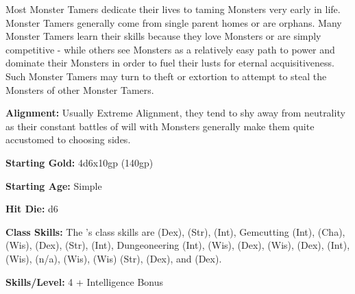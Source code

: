 
Most Monster Tamers dedicate their lives to taming Monsters very early in life. Monster Tamers generally come from single parent homes or are orphans. Many Monster Tamers learn their skills because they love Monsters or are simply competitive - while others see Monsters as a relatively easy path to power and dominate their Monsters in order to fuel their lusts for eternal acquisitiveness. Such Monster Tamers may turn to theft or extortion to attempt to steal the Monsters of other Monster Tamers.

\textbf{Alignment:} Usually Extreme Alignment, they tend to shy away from neutrality as their constant battles of will with Monsters generally make them quite accustomed to choosing sides.

\textbf{Starting Gold:} 4d6x10gp (140gp)

\textbf{Starting Age:} Simple

\textbf{Hit Die:} d6

\textbf{Class Skills:} The \currentclassname{}'s class skills  are  (Dex),  (Str),  (Int),  Gemcutting (Int),  (Cha),  (Wis),  (Dex),  (Str),  (Int),  Dungeoneering (Int),  (Wis),  (Dex),  (Wis),  (Dex),  (Int),  (Wis),  (n/a),  (Wis),  (Wis)  (Str),  (Dex), and  (Dex).

\textbf{Skills/Level:} 4 + Intelligence Bonus

\modebab{}
\poorfor{}
\goodref{}
\poorwil{}

\begin{classtable}
\levelthirteen{-}
\levelsixteen{-}
\end{classtable}

